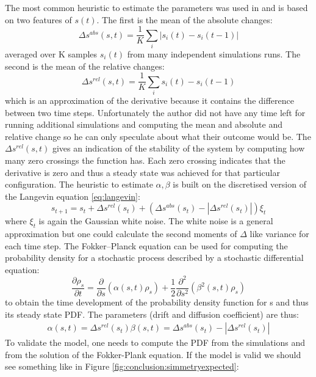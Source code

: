 The most common heuristic to estimate the parameters was
used in \citet{Hamann2010:AnalysisSimmetry} and is based on two features of $s(t)$.
The first is the mean of the absolute changes:
\begin{equation}
\varDelta s^{abs}(s,t)=\frac{1}{K}\sum_i | s_i(t)-s_i(t-1)|
\end{equation}
averaged over K samples $s_i(t)$ from many independent
simulations runs.
The second is the mean of the relative changes:
\begin{equation}
\varDelta s^{rel}(s,t)=\frac{1}{K}\sum_i  s_i(t)-s_i(t-1)
\end{equation}
which is an approximation of the derivative because
it contains the difference between two time steps.
Unfortunately the author did not have any time left for running
additional simulations and computing the mean and absolute
and relative change so he can only speculate about what their outcome would be.
The $\varDelta s^{rel}(s,t)$ gives an indication of the
stability of the system by computing how many zero crossings
the function has.
Each zero crossing indicates that the derivative is zero
and thus a steady state was achieved for that particular
configuration.
The heuristic to estimate $\alpha,\beta$ is built on the discretised
version of the Langevin equation \ref{eq:langevin}:
\begin{equation}
s_{t+1}=s_{t}+ \varDelta s^{rel}(s_t)+( \varDelta s^{abs}(s_t)-|\varDelta s^{rel}(s_t)|)\xi_t
\end{equation}
where $\xi_t$ is again the Gaussian white noise.
The white noise is a general approximation but one could calculate the second
moments of $\varDelta$ like variance for each time step.
The Fokker–Planck equation can be used for computing the probability density
for a stochastic process described by a stochastic differential equation:
\begin{equation}
\frac{\partial \rho_s}{\partial t}=\frac{\partial}{\partial s}(\alpha(s,t)\rho_s)+\frac{1}{2} \frac{\partial^2}{\partial s^2}(\beta^2(s,t)\rho_s)
\end{equation}
to obtain the time development of the probability density function for s and
thus its steady state PDF.
The parameters  (drift and diffusion coefficient) are thus:
\begin{align*}
\alpha(s,t)= \varDelta s^{rel}(s_t)
\beta(s,t)=\varDelta s^{abs}(s_t)-|\varDelta s^{rel}(s_t)|
\end{align*}
To validate the model, one needs to compute the PDF from the simulations
and from the solution of the Fokker-Plank equation.
If the model is valid we should see something like in Figure \ref{fig:conclusion:simmetryexpected}:

